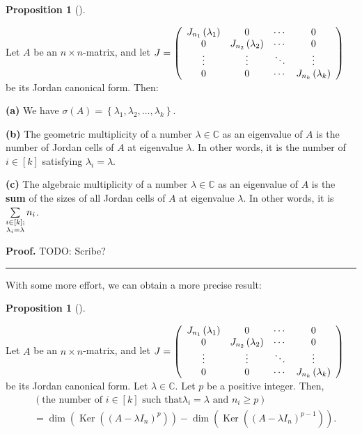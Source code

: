 \documentclass[numbers=enddot,12pt,final,onecolumn,notitlepage]{scrartcl}%
\numberwithin{exer}{subsection}
\theoremstyle{definition}
\newtheorem{prop}[theo]{Proposition}
\newenvironment{proposition}[1][]
{\begin{prop}[#1]\begin{leftbar}}
{\end{leftbar}\end{prop}}
\newenvironment{proof}[1][Proof]{\noindent\textbf{#1.} }{\ \rule{0.5em}{0.5em}}
\let\sumnonlimits\sum
\renewcommand{\sum}{\sumnonlimits\limits}
\begin{document}
\begin{proposition}
\label{prop.jnf.unique.mults}Let $A$ be an $n\times n$-matrix, and let
$J=\left(
\begin{array}
[c]{cccc}%
J_{n_{1}}\left(  \lambda_{1}\right)  & 0 & \cdots & 0\\
0 & J_{n_{2}}\left(  \lambda_{2}\right)  & \cdots & 0\\
\vdots & \vdots & \ddots & \vdots\\
0 & 0 & \cdots & J_{n_{k}}\left(  \lambda_{k}\right)
\end{array}
\right)  $ be its Jordan canonical form. Then: \medskip

\textbf{(a)} We have $\sigma\left(  A\right)  =\left\{  \lambda_{1}%
,\lambda_{2},\ldots,\lambda_{k}\right\}  $. \medskip

\textbf{(b)} The geometric multiplicity of a number $\lambda\in\mathbb{C}$ as
an eigenvalue of $A$ is the number of Jordan cells of $A$ at eigenvalue
$\lambda$. In other words, it is the number of $i\in\left[  k\right]  $
satisfying $\lambda_{i}=\lambda$. \medskip

\textbf{(c)} The algebraic multiplicity of a number $\lambda\in\mathbb{C}$ as
an eigenvalue of $A$ is the \textbf{sum} of the sizes of all Jordan cells of
$A$ at eigenvalue $\lambda$. In other words, it is $\sum
\limits_{\substack{i\in\left[  k\right]  ;\\\lambda_{i}=\lambda}}n_{i}$.
\end{proposition}

\begin{proof}
TODO: Scribe?
\end{proof}

With some more effort, we can obtain a more precise result:

\begin{proposition}
\label{prop.jnf.unique.cellsizes}Let $A$ be an $n\times n$-matrix, and let
$J=\left(
\begin{array}
[c]{cccc}%
J_{n_{1}}\left(  \lambda_{1}\right)  & 0 & \cdots & 0\\
0 & J_{n_{2}}\left(  \lambda_{2}\right)  & \cdots & 0\\
\vdots & \vdots & \ddots & \vdots\\
0 & 0 & \cdots & J_{n_{k}}\left(  \lambda_{k}\right)
\end{array}
\right)  $ be its Jordan canonical form. Let $\lambda\in\mathbb{C}$. Let $p$
be a positive integer. Then,%
\begin{align*}
&  \left(  \text{the number of }i\in\left[  k\right]  \text{ such that
}\lambda_{i}=\lambda\text{ and }n_{i}\geq p\right) \\
&  =\dim\left(  \operatorname*{Ker}\left(  \left(  A-\lambda I_{n}\right)
^{p}\right)  \right)  -\dim\left(  \operatorname*{Ker}\left(  \left(
A-\lambda I_{n}\right)  ^{p-1}\right)  \right)  .
\end{align*}

\end{proposition}
\end{document}
